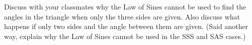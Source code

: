 { Discuss with your classmates why the Law of Sines cannot be used to find the angles in the triangle when only the three sides are given.  Also discuss what happens if only two sides and the angle between them are given.  (Said another way, explain why the Law of Sines cannot be used in the SSS and SAS cases.)}
{}
